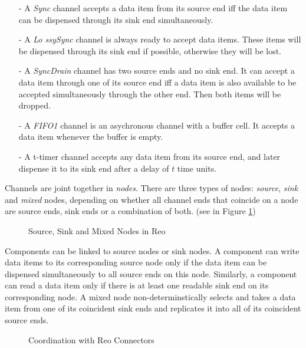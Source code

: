 \documentclass[conference, a4paper]{IEEEtran}
\begin{document}
\begin{itemize}
  \item [-] A \emph{Sync} channel accepts a data item from its source end iff the data item can be
    dispensed through its sink end simultaneously.
  \item [-] A \emph{Lo ssySync} channel is always ready to accept data items. These items will be
    dispensed through its sink end if possible, otherwise they will be lost.
  \item [-] A \emph{SyncDrain} channel has two source ends and no sink end. It can accept a data
    item through one of its source end iff a data item is also available to be accepted
    simultaneously through the other end. Then both items will be dropped.
  \item [-] A \emph{FIFO1} channel is an asychronous channel with a buffer cell. It accepts a
    data item whenever the buffer is empty. 
  \item [-] A t-timer channel accepts any data item from its source end, and later dispense it to
    its sink end after a delay of $t$ time units.

\end{itemize}

Channels are joint together in \emph{nodes}. There are three types of nodes:
\emph{source}, \emph{sink} and \emph{mixed} nodes, depending on whether all channel ends that
coincide on a node are source ends, sink ends or a combination of both.
(see in Figure \ref{fig:node})

\begin{figure}[ht]
  \begin{center}
    
  \end{center}
  \caption{Source, Sink and Mixed Nodes in Reo}
  \label{fig:node}
\end{figure}

Components can be linked to source nodes or sink nodes. A component can write data items to its
corresponding source node only if the data item can be dispensed simultaneously to all source ends
on this node. Similarly, a component can read a data item only if there is at least one readable
sink end on its corresponding node. A mixed node non-determinstically selects and takes a data item
from one of its coincident sink ends and replicates it into all of its coincident source ends.

\begin{figure}[ht]
  \begin{center}
    
  \end{center}
  \caption{Coordination with Reo Connectors}
  \label{fig:reoconnector}
\end{figure}
\end{document}

